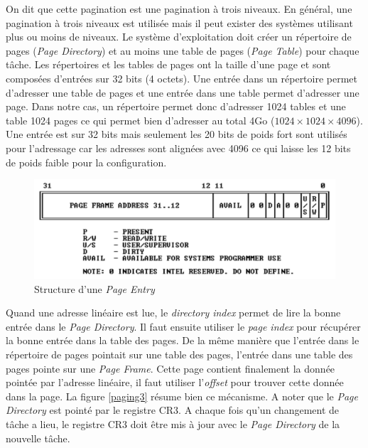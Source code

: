 \documentclass[a4paper, 12pt]{article}
\begin{document}
On dit que cette pagination est une pagination à trois niveaux. En général, une
pagination à trois niveaux est utilisée mais il peut exister des systèmes utilisant
plus ou moins de niveaux. Le système d'exploitation doit créer un répertoire de pages
(\textit{Page Directory}) et au moins une table de pages (\textit{Page Table}) pour
chaque tâche. Les répertoires et les tables de pages ont la taille d'une page et sont
composées d'entrées sur 32 bits (4 octets). Une entrée dans un répertoire permet
d'adresser une table de pages et une entrée dans une table permet d'adresser une page.
Dans notre cas, un répertoire permet donc d'adresser 1024 tables et une table
1024 pages ce qui permet bien d'adresser au total 4Go ($1024 \times 1024 \times 4096$).
Une entrée est sur 32 bits mais seulement les 20 bits de poids fort sont utilisés
pour l'adressage car les adresses sont alignées avec 4096 ce qui laisse les 12 bits
de poids faible pour la configuration.\cite{ref21}

\begin{figure}[!h]
  \centering
  \includegraphics[scale=0.6]{images/page_entry.png}
  \caption{Structure d'une \textit{Page Entry}}
  \label{page_entry}
\end{figure}

Quand une adresse linéaire est lue, le \textit{directory index} permet
de lire la bonne entrée dans le \textit{Page Directory}. Il faut ensuite utiliser
le \textit{page index} pour récupérer la bonne entrée dans la table des pages.
De la même manière que l'entrée dans le répertoire de pages pointait sur une table
des pages, l'entrée dans une table des pages pointe sur une \textit{Page Frame}.
Cette page contient finalement la donnée pointée par l'adresse linéaire, il faut
utiliser l'\textit{offset} pour trouver cette donnée dans la page. La figure \ref{paging3}
résume bien ce mécanisme.\cite{ref66} A noter que le \textit{Page Directory} est
pointé par le registre CR3. A chaque fois qu'un changement de tâche a lieu, le
registre CR3 doit être mis à jour avec le \textit{Page Directory} de la nouvelle
tâche.\cite{ref15}
\end{document}

